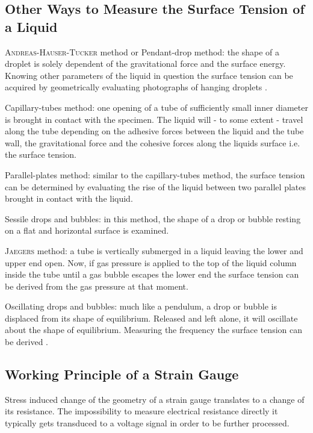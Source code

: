         \subsection*{Other Ways to Measure the Surface Tension of a Liquid}
            \textsc{Andreas-Hauser-Tucker} method or Pendant-drop method: the shape of a droplet is solely dependent of the
            gravitational force and the surface energy. Knowing other parameters of the liquid in question the surface tension
            can be acquired by geometrically evaluating photographs of hanging droplets \cite{Andreas-Hauser-Tucker.surface.tension.pendant.drop.1938}.\par\medskip
            Capillary-tubes method: one opening of a tube of sufficiently small inner diameter is brought in contact with
            the specimen. The liquid will - to some extent - travel along the tube depending on the adhesive forces between
            the liquid and the tube wall, the gravitational force and the cohesive forces along the liquids surface i.e.
            the surface tension.\par\medskip
            Parallel-plates method: similar to the capillary-tubes method, the surface tension can be determined by evaluating
            the rise of the liquid between two parallel plates brought in contact with the liquid.\par\medskip
            Sessile drops and bubbles: in this method, the shape of a drop or bubble resting on a flat and horizontal surface
            is examined.\par\medskip
            \textsc{Jaegers} method: a tube is vertically submerged in a liquid leaving the lower and upper end open. Now,
            if gas pressure is applied to the top of the liquid column inside the tube until a gas bubble escapes the lower
            end the surface tension can be derived from the gas pressure at that moment.\par\medskip
            Oscillating drops and bubbles: much like a pendulum, a drop or bubble is displaced from its shape of equilibrium.
            Released and left alone, it will oscillate about the shape of equilibrium. Measuring the frequency the surface
            tension can be derived \cite{oscillating.drops.surface.tension.Freer.2005}.
        \subsection*{Working Principle of a Strain Gauge}
            Stress induced change of the geometry of a strain gauge translates to a change of its resistance. The impossibility
            to measure electrical resistance directly it typically gets transduced to a voltage signal in order to be further
            processed.
